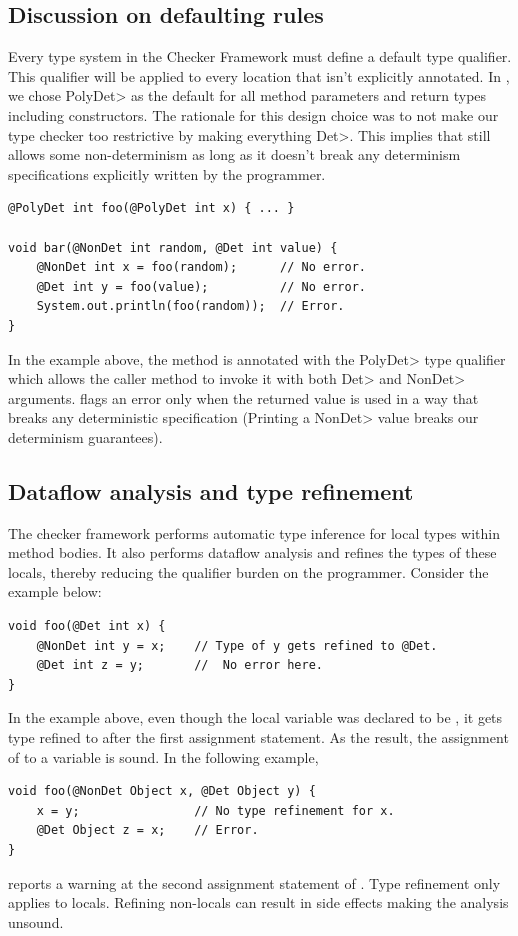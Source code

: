 \subsection{Discussion on defaulting rules}\label{defaulting}
Every type system in the Checker Framework must define a default type qualifier. This qualifier will be applied
to every location that isn't explicitly annotated. In \theDeterminismChecker, we chose \<PolyDet> as the default for all 
method parameters and return types including constructors.
The rationale for this design choice was to not make our type checker too restrictive by making everything \<Det>.  This implies that
\theDeterminismChecker still allows some non-determinism as long as it doesn't break any determinism specifications explicitly written by the programmer.

\begin{verbatim}
@PolyDet int foo(@PolyDet int x) { ... }

void bar(@NonDet int random, @Det int value) {
    @NonDet int x = foo(random);      // No error.
    @Det int y = foo(value);          // No error.
    System.out.println(foo(random));  // Error.
}
\end{verbatim}
In the example above, the method  is annotated with the \<PolyDet> type qualifier which allows
the caller method  to invoke it with both \<Det> and \<NonDet> arguments. \TheDeterminismChecker flags an error 
only when the returned value is used in a way that breaks any deterministic specification (Printing a \<NonDet> value
breaks our determinism guarantees).

\subsection{Dataflow analysis and type refinement}\label{dataflow}
The checker framework performs automatic type inference for local types within method bodies.
It also performs dataflow analysis and refines the types of these locals, thereby reducing the qualifier burden 
on the programmer. Consider the example below:
\begin{verbatim}
void foo(@Det int x) {
    @NonDet int y = x;    // Type of y gets refined to @Det.
    @Det int z = y;       //  No error here.
}
\end{verbatim}
In the example above, even though the local variable  was declared to be , it gets
type refined to  after the first assignment statement. As the result, the assignment of 
to a  variable  is sound. In the following example,
\begin{verbatim}
void foo(@NonDet Object x, @Det Object y) {
    x = y;                // No type refinement for x.
    @Det Object z = x;    // Error.
}
\end{verbatim}
\theDeterminismChecker reports a warning at the second assignment statement of . Type refinement only applies to locals. Refining non-locals can result in side effects making the analysis unsound.

